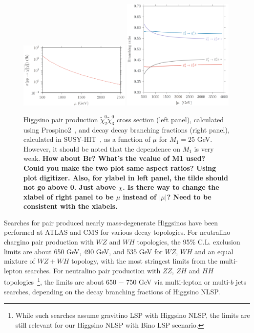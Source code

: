 \documentclass[a4paper,11pt]{article}
\newcommand{\Shufang}[1]{{\bf\color{Maroon}  #1}}
\begin{document}
\begin{figure}[h]
  \centering
  \includegraphics[width=0.49\textwidth]{images/higgsino_production_xsection.png}
  \includegraphics[width=0.49\textwidth]{images/higgsino_br_plot.png}
  \caption{Higgsino pair production $\widetilde\chi_2^0\widetilde\chi_3^0$ cross section (left panel), calculated using Prospino2~\cite{Beenakker:1999xh},  and decay decay branching fractions (right panel), calculated in SUSY-HIT~\cite{Djouadi:2006bz},  as a function of $\mu$ for $M_1=25$ GeV. However, it
  should be noted that the dependence on $M_1$ is very weak.   \Shufang{How about Br? What's the vcalue of M1 used?}\\
  \Shufang{Could you make the two plot same aspect ratios? Using plot digitizer.  Also, for ylabel in left panel, the tilde should not go above 0.  Just above $\chi$.  Is there way to change the xlabel of right panel to be $\mu$ instead of $|\mu|$?  Need to be consistent with the xlabels.}}
  \label{fig:xsection_plot}
\end{figure}

Searches for pair produced nearly mass-degenerate Higgsinos  have been
performed at ATLAS and CMS for various decay  topologies\cite{Aaboud:2018htj,Sirunyan:2018ubx,Aaboud:2018zeb}.  For neutralino-chargino pair production with $WZ$ and $WH$ topologies, the 95\% C.L. exclusion limits are about 650 GeV, 490 GeV, and 535 GeV for $WZ$, $WH$ and an equal mixture of $WZ+WH$ topology, with the most stringest limits from the multi-lepton searches.  For neutralino pair production with $ZZ$, $ZH$ and $HH$ topologies~\footnote{While such searches assume gravitino LSP with Higgsino NLSP, the limits are still relevant for our Higgsino NLSP with Bino LSP scenario.}, the limits are about 650 $-$ 750 GeV via multi-lepton or multi-$b$ jets searches, depending on the decay branching fractions of Higgsino NLSP. 
\end{document}
